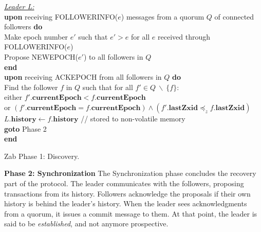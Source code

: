 \documentclass[10pt,onecolumn]{article}
\begin{document}
%
%

\begin{algorithm}[H]
  \SetAlgoNoLine %
  \textit{\underline{Leader L:}} \\
  \textbf{upon} receiving FOLLOWERINFO($e$) messages from a quorum $Q$ of connected followers \textbf{do} \\
    \Indp %
    Make epoch number $e'$ such that $e' > e$ for all $e$ received through FOLLOWERINFO($e$) \\
    Propose NEWEPOCH($e'$) to all followers in $Q$ \\
  \Indm
  \textbf{end} \\
  \textbf{upon} receiving ACKEPOCH from all followers in $Q$ \textbf{do} \\
    \Indp
    Find the follower $f$ in $Q$ such that for all $f' \in Q \ \backslash \ \{f\}$: \\
      \Indp
      either $f'.\mathbf{currentEpoch} < f.\mathbf{currentEpoch}$ \\
      or $(f'.\mathbf{currentEpoch} = f.\mathbf{currentEpoch}) \wedge (f'.\mathbf{lastZxid} \preceq_{z} f.\mathbf{lastZxid})$ \\
    \Indm
    $L.\mathbf{history} \gets f.\mathbf{history}$ \quad // stored to non-volatile memory \\
    \textbf{goto} Phase 2 \\
  \Indm
  \textbf{end}
\caption{Zab Phase 1: Discovery.}
\label{alg:phase1}
\end{algorithm}

\textbf{Phase 2: Synchronization} The Synchronization phase concludes the recovery part of the protocol. The leader communicates with the followers, proposing transactions from its history. Followers acknowledge the proposals if their own history is behind the leader's history. When the leader sees acknowledgments from a quorum, it issues a commit message to them. At that point, the leader is said to be \textit{established}, and not anymore prospective.
\end{document}
